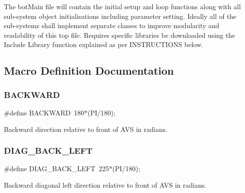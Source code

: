 The bot\+Main file will contain the initial setup and loop functions along with all sub-\/system object initialisations including parameter setting. Ideally all of the sub-\/systems shall implement separate classes to improve modularity and readability of this top file. Requires specific libraries be downloaded using the Include Library function explained as per I\+N\+S\+T\+R\+U\+C\+T\+I\+O\+NS below. 

\subsection{Macro Definition Documentation}
\mbox{\label{bot_main_8ino_adf445abfe1b77fa63f89e315ccc2f7f2}} 
\subsubsection{\texorpdfstring{B\+A\+C\+K\+W\+A\+RD}{BACKWARD}}
{\footnotesize\ttfamily \#define B\+A\+C\+K\+W\+A\+RD~180$\ast$(PI/180);}



Backward direction relative to front of A\+VS in radians. 

\mbox{\label{bot_main_8ino_ae4e94bd8dbc179e392c03bd987d6b05b}} 
\subsubsection{\texorpdfstring{D\+I\+A\+G\+\_\+\+B\+A\+C\+K\+\_\+\+L\+E\+FT}{DIAG\_BACK\_LEFT}}
{\footnotesize\ttfamily \#define D\+I\+A\+G\+\_\+\+B\+A\+C\+K\+\_\+\+L\+E\+FT~225$\ast$(PI/180);}



Backward diagonal left direction relative to front of A\+VS in radians. 

\mbox{\label{bot_main_8ino_a2556f3b6bde97cfd17b3df68e3fca5fd}} 
